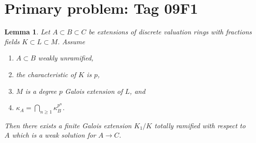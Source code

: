 \documentclass{amsart}
\theoremstyle{plain}
\newtheorem{lemma}[subsection]{Lemma}
\theoremstyle{definition}
\theoremstyle{remark}
\numberwithin{equation}{subsection}
\begin{document}
\section*{Primary problem: Tag 09F1}
\begin{lemma}
\label{lemma-characteristic-p-case}
Let $A \subset B \subset C$ be extensions of discrete valuation rings
with fractions fields $K \subset L \subset M$. Assume
\begin{enumerate}
\item $A \subset B$ weakly unramified,
\item the characteristic of $K$ is $p$,
\item $M$ is a degree $p$ Galois extension of $L$, and
\item $\kappa_A = \bigcap_{n \geq 1} \kappa_B^{p^n}$.
\end{enumerate}
Then there exists a finite Galois extension $K_1/K$
totally ramified with respect to $A$
which is a weak solution for $A \to C$.
\end{lemma}
\end{document}

